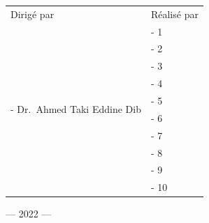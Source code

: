 \documentclass[french,11pt]{report}
\begin{document}
\begin{titlepage}
    \vspace{0.05\textheight}

    \begin{tabular}{l l}
        \Large Dirigé par                                          & \Large Réalisé par \\
        \multirow{10}{24em}{\large{- Dr.\ Ahmed Taki Eddine Dib }} & \large{- 1}        \\
                                                                   & \large{- 2}        \\
                                                                   & \large{- 3}        \\
                                                                   & \large{- 4}        \\
                                                                   & \large{- 5}        \\
                                                                   & \large{- 6}        \\
                                                                   & \large{- 7}        \\
                                                                   & \large{- 8}        \\
                                                                   & \large{- 9}        \\
                                                                   & \large{- 10}       \\
    \end{tabular}
    \vspace{4.3em}

    \centering
    --- 2022 ---
\end{titlepage}
\tableofcontents
\listoffigures
\listoftables

\pagebreak

\end{document}
